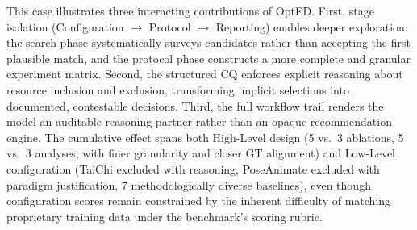 This case illustrates three interacting contributions of OptED. First, stage isolation (Configuration $\rightarrow$ Protocol $\rightarrow$ Reporting) enables deeper exploration: the search phase systematically surveys candidates rather than accepting the first plausible match, and the protocol phase constructs a more complete and granular experiment matrix. Second, the structured CQ enforces explicit reasoning about resource inclusion and exclusion, transforming implicit selections into documented, contestable decisions. Third, the full workflow trail renders the model an auditable reasoning partner rather than an opaque recommendation engine. The cumulative effect spans both High-Level design (5 vs.\ 3 ablations, 5 vs.\ 3 analyses, with finer granularity and closer GT alignment) and Low-Level configuration (TaiChi excluded with reasoning, PoseAnimate excluded with paradigm justification, 7 methodologically diverse baselines), even though configuration scores remain constrained by the inherent difficulty of matching proprietary training data under the benchmark's scoring rubric.

